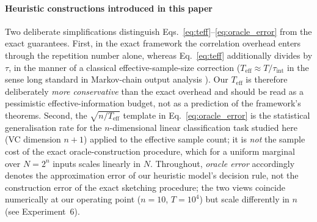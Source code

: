 \documentclass[sensors,article,submit,pdftex,moreauthors]{Definitions/mdpi}
\newcommand{\Teff}{T_{\mathrm{eff}}}
\providecommand{\DIFadd}[1]{{\protect\color{blue}#1}} %
\providecommand{\DIFdel}[1]{} %
\providecommand{\DIFaddbegin}{} %
\providecommand{\DIFaddend}{} %
\providecommand{\DIFdelbegin}{} %
\providecommand{\DIFdelend}{} %
\begin{document}
\DIFaddend \paragraph{\DIFdelbegin \DIFdel{Relation to the exact framework}\DIFdelend \DIFaddbegin \DIFadd{Heuristic constructions introduced in this paper}\DIFaddend } Two deliberate simplifications distinguish Eqs.~\eqref{eq:teff}--\eqref{eq:oracle_error} from the \DIFdelbegin \DIFdel{guarantees of }%
\DIFdelend \DIFaddbegin \DIFadd{exact guarantees}\DIFaddend . First, in the exact framework the correlation overhead enters through the repetition number \DIFdelbegin \DIFdel{alone---oracle-construction sample complexity is multiplied by $R$, while the refreshing time only delimits the window over which $R$ is measured---whereas }\DIFdelend \DIFaddbegin \DIFadd{alone, whereas }\DIFaddend Eq.~\eqref{eq:teff} additionally divides by $\tau$, in the manner of a classical effective-sample-size correction ($\Teff \approx T/\tau_{\mathrm{int}}$ \DIFaddbegin \DIFadd{in the sense long standard in Markov-chain output analysis }\citep{geyer1992practical}\DIFaddend ). Our $\Teff$ is therefore deliberately \emph{more conservative} than the exact overhead and should be read as a \DIFdelbegin \DIFdel{lower bound on effective information content}\DIFdelend \DIFaddbegin \DIFadd{pessimistic effective-information budget}\DIFaddend , not as a prediction of the framework's theorems. Second, the $\sqrt{n/\Teff}$ template in Eq.~\eqref{eq:oracle_error} is the statistical generalisation rate for the $n$-dimensional linear classification task studied here (VC dimension $n{+}1$) applied to the effective sample count; it is \DIFdelbegin \DIFdel{not }\DIFdelend \DIFaddbegin \emph{\DIFadd{not}} \DIFaddend the sample cost of the exact oracle-construction procedure, which for a uniform marginal over $N = 2^n$ inputs scales linearly in $N$. Throughout, \emph{oracle error} accordingly denotes the approximation error of our heuristic model's decision rule, not the construction error of the exact sketching procedure; the two views coincide numerically at our operating point ($n = 10$, $T = 10^4$) but scale differently in $n$ (see Experiment~6).
\end{document}

